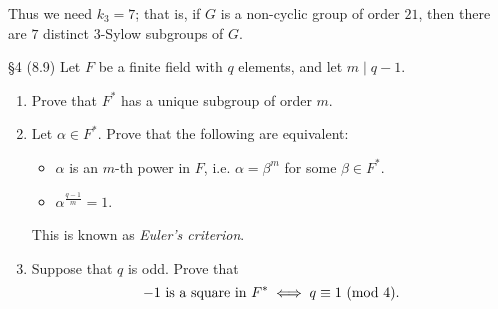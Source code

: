 \documentclass{homework}
\begin{document}
\begin{solution}
\begin{enumerate}[label=(\alph*)]
      Thus we need $k_3=7$; that is, if $G$ is a non-cyclic group of order $21$, then there are $7$
      distinct $3$-Sylow subgroups of $G$.
  \end{enumerate}
\end{solution}

\begin{problem}{\S 4}
  (8.9) Let $F$ be a finite field with $q$ elements, and let $m\mid q-1$.
  \begin{enumerate}[label=(\alph*)]
    \item Prove that $F^*$ has a unique subgroup of order $m$.
    \item Let $\alpha\in F^*$. Prove that the following are equivalent:
      \begin{itemize}
        \item $\alpha$ is an $m$-th power in $F$, i.e. $\alpha=\beta^m$ for some $\beta\in F^*$.
        \item $\alpha^{\frac{q-1}{m}}=1$.
      \end{itemize}
      This is known as \textit{Euler's criterion}.
    \item Suppose that $q$ is odd. Prove that \[
        -1~\text{is a square in}~F^*\iff q\equiv 1\ (\mathrm{mod}\ 4)
    .\] 
  \end{enumerate}
\end{problem}
\end{document}
